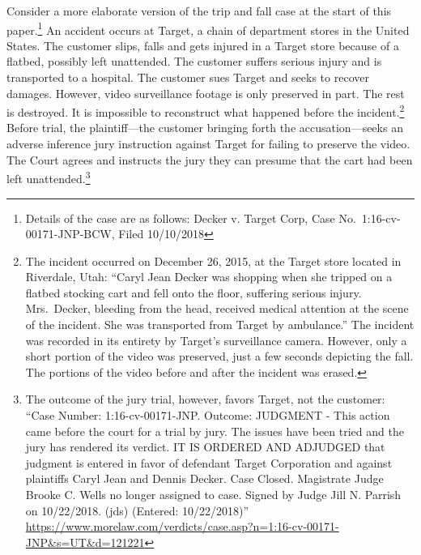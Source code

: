 \documentclass[
  10pt,
  dvipsnames,enabledeprecatedfontcommands]{scrartcl}
\begin{document}
Consider a more elaborate version of the trip and fall
case at the start of this paper.\footnote{Details of the case are as
  follows: Decker v. Target Corp, Case No.~1:16-cv-00171-JNP-BCW, Filed
  10/10/2018} An accident occurs at Target, a chain of department stores
in the United States. The customer slips, falls and gets injured in a
Target store because of a flatbed, possibly left unattended. The
customer suffers serious injury and is transported to a hospital. The
customer sues Target and seeks to recover damages. However, video
surveillance footage is only preserved in part. The rest is destroyed.
It is impossible to reconstruct what happened before the
incident.\footnote{The incident occurred on December 26, 2015, at the
  Target store located in Riverdale, Utah: ``Caryl Jean Decker was
  shopping when she tripped on a flatbed stocking cart and fell onto the
  floor, suffering serious injury. Mrs.~Decker, bleeding from the head,
  received medical attention at the scene of the incident. She was
  transported from Target by ambulance.'' The incident was recorded in
  its entirety by Target's surveillance camera. However, only a short
  portion of the video was preserved, just a few seconds depicting the
  fall. The portions of the video before and after the incident was
  erased.} Before trial, the plaintiff---the customer bringing forth the
accusation---seeks an adverse inference jury instruction against Target
for failing to preserve the video. The Court agrees and instructs the
jury they can presume that the cart had been left unattended.\footnote{The
  outcome of the jury trial, however, favors Target, not the customer:
  ``Case Number: 1:16-cv-00171-JNP. Outcome: JUDGMENT - This action came
  before the court for a trial by jury. The issues have been tried and
  the jury has rendered its verdict. IT IS ORDERED AND ADJUDGED that
  judgment is entered in favor of defendant Target Corporation and
  against plaintiffs Caryl Jean and Dennis Decker. Case Closed.
  Magistrate Judge Brooke C. Wells no longer assigned to case. Signed by
  Judge Jill N. Parrish on 10/22/2018. (jds) (Entered: 10/22/2018)''
  \url{https://www.morelaw.com/verdicts/case.asp?n=1:16-cv-00171-JNP\&s=UT\&d=121221}}
\end{document}

